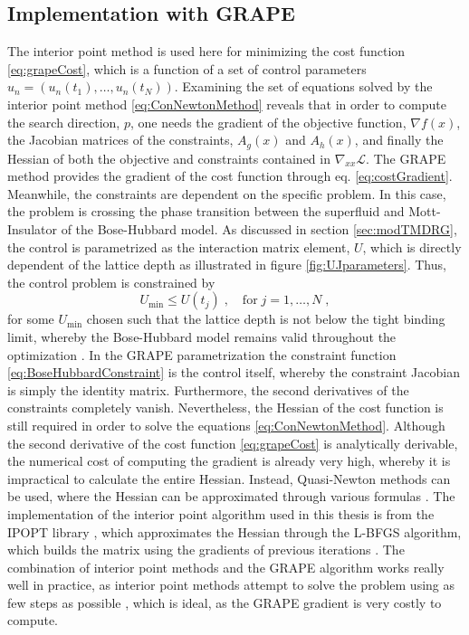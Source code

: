 \subsection{Implementation with GRAPE} \label{sec:IpoptGRAPE}
The interior point method is used here for minimizing the cost function \eqref{eq:grapeCost}, which is a function of a set of control parameters $u_n = \left( u_n (t_1) , \ldots , u_n (t_N)  \right)$. Examining the set of equations solved by the interior point method \eqref{eq:ConNewtonMethod} reveals that in order to compute the search direction, $p$, one needs the gradient of the objective function, $\nabla f(x)$, the Jacobian matrices of the constraints, $A_g (x)$ and $A_h (x)$, and finally the Hessian of both the objective and constraints contained in $\nabla_{xx} \mathcal{L}$.
The GRAPE method provides the gradient of the cost function through eq. \eqref{eq:costGradient}. 
Meanwhile, the constraints are dependent on the specific problem. In this case, the problem is crossing the phase transition between the superfluid and Mott-Insulator of the Bose-Hubbard model. As discussed in section \ref{sec:modTMDRG}, the control is parametrized as the interaction matrix element, $U$, which is directly dependent of the lattice depth as illustrated in figure \ref{fig:UJparameters}. Thus, the control problem is constrained by 
\begin{equation}
	U_{\mathrm{min}} \leq U(t_j) \; , \quad \mathrm{for} \; j = 1 , \ldots , N \; ,
	\label{eq:BoseHubbardConstraint}
\end{equation} 
for some $U_{\mathrm{min}}$ chosen such that the lattice depth is not below the tight binding limit, whereby the Bose-Hubbard model remains valid throughout the optimization \cite{manybodyBloch}. In the GRAPE parametrization the constraint function \eqref{eq:BoseHubbardConstraint} is the control itself, whereby the constraint Jacobian is simply the identity matrix. 
Furthermore, the second derivatives of the constraints completely vanish. Nevertheless, the Hessian of the cost function is still required in order to solve the equations \eqref{eq:ConNewtonMethod}. Although the second derivative of the cost function \eqref{eq:grapeCost} is analytically derivable, the numerical cost of computing the gradient is already very high, whereby it is impractical to calculate the entire Hessian. Instead, Quasi-Newton methods can be used, where the Hessian can be approximated through various formulas \cite{wright}. The implementation of the interior point algorithm used in this thesis is from the IPOPT library \cite{Wachter2006}, which approximates the Hessian through the L-BFGS algorithm, which builds the matrix using the gradients of previous iterations \cite{Liu1989}. The combination of interior point methods and the GRAPE algorithm works really well in practice, as interior point methods attempt to solve the problem using as few steps as possible \cite{wright}, which is ideal, as the GRAPE gradient is very costly to compute.



